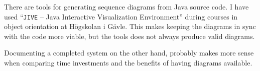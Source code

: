 There are tools for generating sequence diagrams from Java source code.  I have
used ``\texttt{JIVE} -- Java Interactive Visualization
Environment''\cite{tools:jive} during courses in object orientation at
Högskolan i Gävle. This makes keeping the diagrams in sync with the code more
viable, but the tools does not always produce valid diagrams.


Documenting a completed system on the other hand, probably makes more sense
when comparing time investments and the benefits of having diagrams available.


